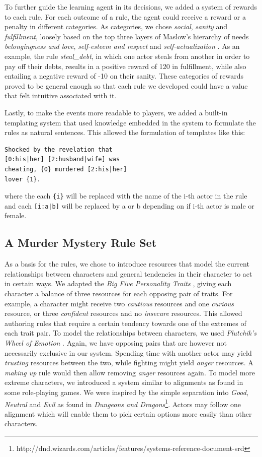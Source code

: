 To further guide the learning agent in its decisions, we added a system of rewards to each rule.
For each outcome of a rule, the agent could receive a reward or a penalty in different categories.
As categories, we chose \emph{social}, \emph{sanity} and \emph{fulfillment}, loosely based on the top three layers of Maslow's hierarchy of needs \emph{belongingness and love}, \emph{self-esteem and respect} and \emph{self-actualization} \cite{maslow_1943}.
As an example, the rule \emph{steal\_debt}, in which one actor steals from another in order to pay off their debts, results in a positive reward of 120 in fulfillment, while also entailing a negative reward of -10 on their sanity.
These categories of rewards proved to be general enough so that each rule we developed could have a value that felt intuitive associated with it.

Lastly, to make the events more readable to players, we added a built-in templating system that used knowledge embedded in the system to formulate the rules as natural sentences.
This allowed the formulation of templates like this:
\begin{lstlisting}
Shocked by the revelation that
[0:his|her] [2:husband|wife] was
cheating, {0} murdered [2:his|her]
lover {1}.
\end{lstlisting}
where the each \lstinline|{i}| will be replaced with the name of the i-th actor in the rule and each \lstinline{[i:a|b]} will be replaced by a or b depending on if i-th actor is male or female.

\subsection{A Murder Mystery Rule Set}

As a basis for the rules, we chose to introduce resources that model the current relationships between characters and general tendencies in their character to act in certain ways. We adapted the \emph{Big Five Personality Traits} \cite{rothmann_coetzer_2003}, giving each character a balance of three resources for each opposing pair of traits. For example, a character might receive two \emph{cautious} resources and one \emph{curious} resource, or three \emph{confident} resources and no \emph{insecure} resources. This allowed authoring rules that require a certain tendency towards one of the extremes of each trait pair. To model the relationships between characters, we used \emph{Plutchik's Wheel of Emotion} \cite{plutchik_2001}. Again, we have opposing pairs that are however not necessarily exclusive in our system. Spending time with another actor may yield \emph{trusting} resources between the two, while fighting might yield \emph{anger} resources. A \emph{making up} rule would then allow removing \emph{anger} resources again. To model more extreme characters, we introduced a system similar to alignments as found in some role-playing games. We were inspired by the simple separation into \emph{Good}, \emph{Neutral} and \emph{Evil} as found in \emph{Dungeons and Dragons}\footnote{http://dnd.wizards.com/articles/features/systems-reference-document-srd}. Actors may follow one alignment which will enable them to pick certain options more easily than other characters.

